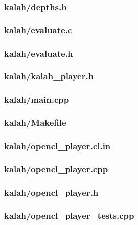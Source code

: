 \documentclass{article}
\begin{document}
\subsubsection*{kalah/depths.h}


\subsubsection*{kalah/evaluate.c}


\subsubsection*{kalah/evaluate.h}


\subsubsection*{kalah/kalah\_player.h}


\subsubsection*{kalah/main.cpp}


\subsubsection*{kalah/Makefile}


\subsubsection*{kalah/opencl\_player.cl.in}


\subsubsection*{kalah/opencl\_player.cpp}


\subsubsection*{kalah/opencl\_player.h}


\subsubsection*{kalah/opencl\_player\_tests.cpp}

\end{document}
